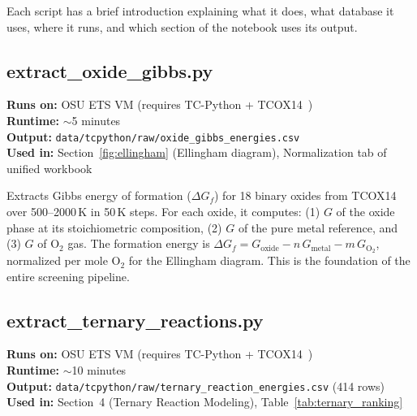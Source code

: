 \documentclass[11pt]{article}
\begin{document}
Each script has a brief introduction explaining what it does, what database it uses, where it runs, and which section of the notebook uses its output.


\subsection{extract\_oxide\_gibbs.py}
\label{script:extract_oxide_gibbs}

\textbf{Runs on:} OSU ETS VM (requires TC-Python + TCOX14~\cite{TCOX14})\\
\textbf{Runtime:} $\sim$5 minutes\\
\textbf{Output:} \texttt{data/tcpython/raw/oxide\_gibbs\_energies.csv}\\
\textbf{Used in:} Section~\ref{fig:ellingham} (Ellingham diagram), Normalization tab of unified workbook

Extracts Gibbs energy of formation ($\Delta G_f$) for 18 binary oxides from TCOX14 over 500--2000\,K in 50\,K steps. For each oxide, it computes: (1) $G$ of the oxide phase at its stoichiometric composition, (2) $G$ of the pure metal reference, and (3) $G$ of O$_2$ gas. The formation energy is $\Delta G_f = G_{\text{oxide}} - n\,G_{\text{metal}} - m\,G_{\text{O}_2}$, normalized per mole O$_2$ for the Ellingham diagram. This is the foundation of the entire screening pipeline.



\cleardoublepage
\subsection{extract\_ternary\_reactions.py}
\label{script:extract_ternary}

\textbf{Runs on:} OSU ETS VM (requires TC-Python + TCOX14~\cite{TCOX14})\\
\textbf{Runtime:} $\sim$10 minutes\\
\textbf{Output:} \texttt{data/tcpython/raw/ternary\_reaction\_energies.csv} (414 rows)\\
\textbf{Used in:} Section~4 (Ternary Reaction Modeling), Table~\ref{tab:ternary_ranking}
\end{document}
